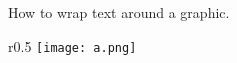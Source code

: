 
\begin{frame}{How to wrap text around a graphic.}

    \begin{wrapfigure}{r}{0.5\textwidth}
        \centering
        \texttt{[image: a.png]}
        \caption{Wrapping text around figures}
    \end{wrapfigure}
    
    \small \blindtext %
\end{frame}